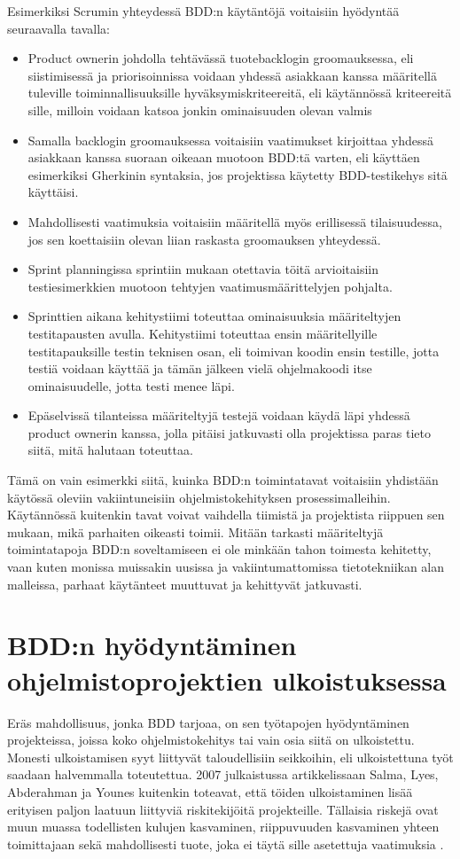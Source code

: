 \documentclass[finnish,nonumbib,nocopyright]{gradu2}
\begin{document}
Esimerkiksi Scrumin \cite{scrumguide} yhteydessä BDD:n käytäntöjä voitaisiin hyödyntää seuraavalla tavalla:
\begin{itemize}
\item Product ownerin johdolla tehtävässä tuotebacklogin groomauksessa, eli siistimisessä ja priorisoinnissa voidaan yhdessä asiakkaan kanssa määritellä tuleville toiminnallisuuksille hyväksymiskriteereitä, eli käytännössä kriteereitä sille, milloin voidaan katsoa jonkin ominaisuuden olevan valmis
\item Samalla backlogin groomauksessa voitaisiin vaatimukset kirjoittaa yhdessä asiakkaan kanssa suoraan oikeaan muotoon BDD:tä varten, eli käyttäen esimerkiksi Gherkinin syntaksia, jos projektissa käytetty BDD-testikehys sitä käyttäisi.
\item Mahdollisesti vaatimuksia voitaisiin määritellä myös erillisessä tilaisuudessa, jos sen koettaisiin olevan liian raskasta groomauksen yhteydessä.
\item Sprint planningissa sprintiin mukaan otettavia töitä arvioitaisiin testiesimerkkien muotoon tehtyjen vaatimusmäärittelyjen pohjalta.
\item Sprinttien aikana kehitystiimi toteuttaa ominaisuuksia määriteltyjen testitapausten avulla. Kehitystiimi toteuttaa ensin määritellyille testitapauksille testin teknisen osan, eli toimivan koodin ensin testille, jotta testiä voidaan käyttää ja tämän jälkeen vielä ohjelmakoodi itse ominaisuudelle, jotta testi menee läpi. 
\item Epäselvissä tilanteissa määriteltyjä testejä voidaan käydä läpi yhdessä product ownerin kanssa, jolla pitäisi jatkuvasti olla projektissa paras tieto siitä, mitä halutaan toteuttaa. 
\end{itemize}
Tämä on vain esimerkki siitä, kuinka BDD:n toimintatavat voitaisiin yhdistään käytössä oleviin vakiintuneisiin ohjelmistokehityksen prosessimalleihin. Käytännössä kuitenkin tavat voivat vaihdella tiimistä ja projektista riippuen sen mukaan, mikä parhaiten oikeasti toimii. Mitään tarkasti määriteltyjä toimintatapoja BDD:n soveltamiseen ei ole minkään tahon toimesta kehitetty, vaan kuten monissa muissakin uusissa ja vakiintumattomissa tietotekniikan alan malleissa, parhaat käytänteet muuttuvat ja kehittyvät jatkuvasti.

\section{BDD:n hyödyntäminen ohjelmistoprojektien ulkoistuksessa}
Eräs mahdollisuus, jonka BDD tarjoaa, on sen työtapojen hyödyntäminen projekteissa, joissa koko ohjelmistokehitys tai vain osia siitä on ulkoistettu. Monesti ulkoistamisen syyt liittyvät taloudellisiin seikkoihin, eli ulkoistettuna työt saadaan halvemmalla toteutettua. 2007 julkaistussa artikkelissaan \cite{qualityrisk} Salma, Lyes, Abderahman ja Younes kuitenkin toteavat, että töiden ulkoistaminen lisää erityisen paljon laatuun liittyviä riskitekijöitä projekteille. Tällaisia riskejä ovat muun muassa todellisten kulujen kasvaminen, riippuvuuden kasvaminen yhteen toimittajaan sekä mahdollisesti tuote, joka ei täytä sille asetettuja vaatimuksia \cite{qualityrisk}.
\end{document}
